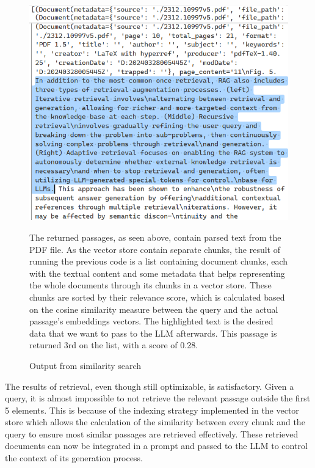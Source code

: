 \begin{figure}[htbp]
    \centering
    \includegraphics[width=\linewidth]{./figures/vectorstoresimilaritysearchwithscore_output.png}
    \caption{Output from similarity search}
    \begin{flushleft}
        \small The returned passages, as seen above, contain parsed text from the PDF file. As the vector store contain separate chunks, the result of running the previous code is a list containing document chunks, each with the textual content and some metadata that helps representing the whole documents through its chunks in a vector store. These chunks are sorted by their relevance score, which is calculated based on the cosine similarity measure between the query and the actual passage's embeddings vectors. The highlighted text is the desired data that we want to pass to the LLM afterwards. This passage is returned 3rd on the list, with a score of 0.28.
    \end{flushleft}
\end{figure}\newpage
The results of retrieval, even though still optimizable, is satisfactory. Given a query, it is almost impossible to not retrieve the relevant passage outside the first 5 elements. This is because of the indexing strategy implemented in the vector store which allows the calculation of the similarity between every chunk and the query to ensure most similar passages are retrieved effectively.\newline
These retrieved documents can now be integrated in a prompt and passed to the LLM to control the context of its generation process.\newpage

